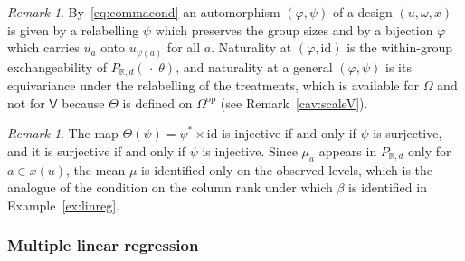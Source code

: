 \documentclass[11pt,a4paper]{article}
\theoremstyle{plain}
\theoremstyle{definition}
\theoremstyle{remark}
\newtheorem{remark}[theorem]{Remark}
\newcommand{\cat}[1]{\mathsf{#1}}
\newcommand{\catV}{\cat{V}}
\newcommand{\catO}{\cat{\Omega}}
\newcommand{\op}{\mathrm{op}}
\newcommand{\id}{\mathrm{id}}
\newcommand{\R}{\mathbb{R}}
\begin{document}
\begin{remark}\label{rem:oneway-aut}
By~\eqref{eq:commacond} an automorphism $(\varphi,\psi)$ of a design
$(u,\omega,x)$ is given by a relabelling $\psi$ which preserves the group sizes
and by a bijection $\varphi$ which carries $u_a$ onto $u_{\psi(a)}$ for all
$a$. Naturality at $(\varphi,\id)$ is the within-group exchangeability of
$P_{\R,d}(\,\cdot \mid \theta)$, and naturality at a general $(\varphi,\psi)$
is its equivariance under the relabelling of the treatments, which is
available for $\catO$ and not for $\catV$ because $\Theta$ is defined on
$\catO^{\op}$ (see Remark~\ref{cav:scaleV}).
\end{remark}

\begin{remark}\label{rem:oneway-ident}
The map $\Theta(\psi) = \psi^{*} \times \id$ is injective if and only if $\psi$
is surjective, and it is surjective if and only if $\psi$ is injective. Since
$\mu_a$ appears in $P_{\R,d}$ only for $a \in x(u)$, the mean $\mu$ is
identified only on the observed levels, which is the analogue of the condition
on the column rank under which $\beta$ is identified in
Example~\ref{ex:linreg}.
\end{remark}

\subsubsection{Multiple linear regression}
\end{document}
